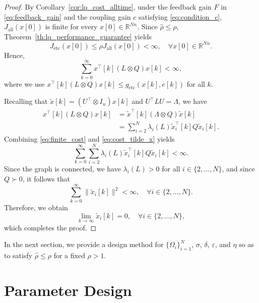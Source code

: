 \documentclass[letterpaper,10pt,conference]{ieeeconf}
\begin{document}
\begin{proof}
  By Corollary~\ref{cor:lq_cost_alltime}, under the feedback gain $F$ in \eqref{eq:feedback_gain}
  and the coupling gain $c$ satisfying \eqref{eq:condition_c}, $J_{\mathrm{all}}(x[0])$ is finite for every $x[0] \in \mathbb{R}^{Nn}$.
  Since $\hat\rho \leq \rho$, Theorem~\ref{th:lq_performance_guarantee} yields
  \begin{equation}
    J_{\mathrm{etc}}(x[0]) \leq \rho J_{\mathrm{all}}(x[0]) < \infty,
    \quad \forall x[0] \in \mathbb{R}^{Nn}.
  \end{equation}
  Hence,
  \begin{equation} \label{eq:finite_cost}
    \sum_{k=0}^{\infty} x^\top[k](L \otimes Q)x[k] < \infty,
  \end{equation}
  where we use $x^\top[k](L \otimes Q)x[k] \leq g_{\mathrm{etc}}(x[k],e[k])$ for all $k$.

  Recalling that $\tilde{x}[k] = (U^\top \otimes I_n)x[k]$ and $U^\top L U = \Lambda$, we have
  \begin{align}
    x^\top[k](L \otimes Q)x[k]
    &= \tilde{x}^\top[k](\Lambda \otimes Q)\tilde{x}[k] \\
    &= \sum_{i=2}^N \lambda_i(L)\tilde{x}_i^\top[k]Q\tilde{x}_i[k] \label{eq:cost_tilde_x}.
  \end{align}
  Combining \eqref{eq:finite_cost} and \eqref{eq:cost_tilde_x} yields
  \begin{equation}
    \sum_{k=0}^{\infty}\sum_{i=2}^N \lambda_i(L)\tilde{x}_i^\top[k]Q\tilde{x}_i[k] < \infty.
  \end{equation}
  Since the graph is connected, we have $\lambda_i(L) > 0$ for all $i\in\{2,\dots,N\}$, and since $Q \succ 0$, it follows that
  \begin{equation}
    \sum_{k=0}^{\infty} \|\tilde{x}_i[k]\|^2 < \infty, \quad \forall i \in \{2,\dots,N\}.
  \end{equation}
  Therefore, we obtain
  \begin{equation}
    \lim_{k \to \infty} \tilde{x}_i[k] = 0,\quad \forall i \in \{2,\dots,N\},
  \end{equation}
  which completes the proof.
\end{proof}

In the next section, we provide a design method for $\{\Omega_i\}_{i=1}^N$, $\sigma$, $\delta$, $\varepsilon$, and $\eta$ so as to satisfy $\hat\rho \leq \rho$ for a fixed $\rho > 1$.

\section{Parameter Design}
\label{sec:parameter}
\end{document}
